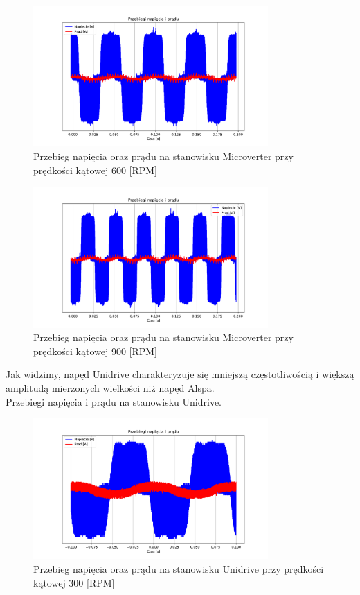 \documentclass[11pt]{article}
\begin{document}
\begin{figure}[H]
\centering
\includegraphics[width=0.8\textwidth]{aun1_microverter_rpm600.pdf}
\caption{Przebieg napięcia oraz prądu na stanowisku Microverter przy prędkości kątowej 600 [RPM]}
\end{figure}

\begin{figure}[H]
\centering
\includegraphics[width=0.8\textwidth]{aun1_microverter_rpm900.pdf}
\caption{Przebieg napięcia oraz prądu na stanowisku Microverter przy prędkości kątowej 900 [RPM]}
\end{figure}

Jak widzimy, napęd Unidrive charakteryzuje się mniejszą częstotliwością i większą amplitudą mierzonych wielkości niż napęd Alspa.\\

Przebiegi napięcia i prądu na stanowisku Unidrive.\\

\begin{figure}[H]
\centering
\includegraphics[width=0.8\textwidth]{aun1_unidrive_rpm300.pdf}
\caption{Przebieg napięcia oraz prądu na stanowisku Unidrive przy prędkości kątowej 300 [RPM]}
\end{figure}
\end{document}
